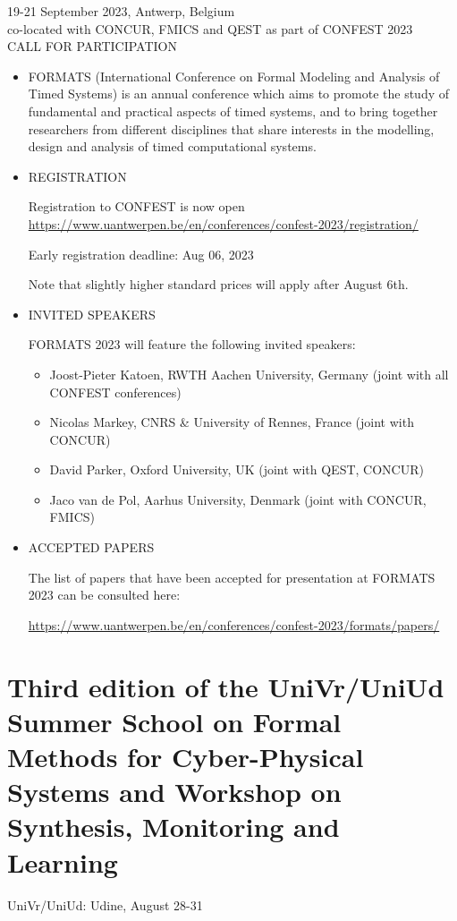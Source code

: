 \documentclass[prodmode,acmtecs]{acmsmall} %
\begin{document}
  19-21 September 2023, Antwerp, Belgium\\ 
  co-located with CONCUR, FMICS and QEST as part of CONFEST 2023\\ 
CALL FOR PARTICIPATION 

\begin{itemize}\item  FORMATS (International Conference on Formal Modeling and Analysis of Timed Systems) is an annual conference which aims to promote the study of fundamental and practical aspects of timed systems, and to bring together researchers from different disciplines that share interests in the modelling, design and analysis of timed computational systems. 
 
\item  REGISTRATION 
 
  Registration to CONFEST is now open \href{https://www.uantwerpen.be/en/conferences/confest-2023/registration/}{https://www.uantwerpen.be/en/conferences/confest-2023/registration/} 
 
Early registration deadline: Aug 06, 2023 
 
  Note that slightly higher standard prices will apply after August 6th. 
 
\item  INVITED SPEAKERS  
 
  FORMATS 2023 will feature the following invited speakers: 
 
\begin{itemize}\item  Joost-Pieter Katoen, RWTH Aachen University, Germany (joint with all CONFEST conferences)
\item  Nicolas Markey, CNRS \& University of Rennes, France (joint with CONCUR)
\item  David Parker, Oxford University, UK (joint with QEST, CONCUR)
\item  Jaco van de Pol, Aarhus University, Denmark (joint with CONCUR, FMICS)
\end{itemize} 
\item  ACCEPTED PAPERS 
 
  The list of papers that have been accepted for presentation at FORMATS 2023 can be consulted here: 
 
  \href{https://www.uantwerpen.be/en/conferences/confest-2023/formats/papers/}{https://www.uantwerpen.be/en/conferences/confest-2023/formats/papers/} 
 
\end{itemize}\section{Third edition of the UniVr/UniUd Summer School on Formal Methods for Cyber-Physical Systems and Workshop on Synthesis, Monitoring and Learning}\label{ThirdeditionoftheUniVrUniUdSummerSchoolonFormalMethodsforCyberPhysicalSystemsandWorkshoponSynthesisMonitoringandLearning}  UniVr/UniUd:  Udine, August 28-31\\ 
\end{document}
